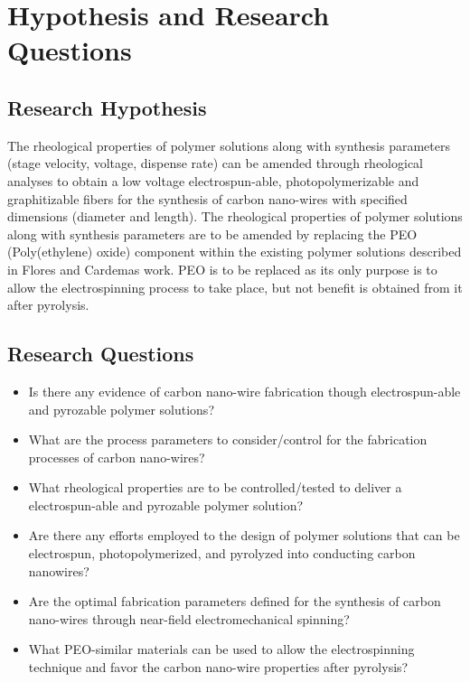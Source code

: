 
\chapter{Hypothesis and Research Questions} %

\label{Chapter:HypothesisandResearchQuestions}


\section{Research Hypothesis}

The rheological properties of polymer solutions along with synthesis parameters (stage velocity, voltage, dispense rate) can be amended through rheological analyses to obtain a low voltage electrospun-able, photopolymerizable and graphitizable fibers for the synthesis of carbon nano-wires with specified dimensions (diameter and length). The rheological properties of polymer solutions along with synthesis parameters are to be amended by replacing the PEO (Poly(ethylene) oxide) component within the existing polymer solutions described in Flores \cite{Flores2017} and Cardemas \cite{Cardenas2017} work. PEO is to be replaced as its only purpose is to allow the electrospinning process to take place, but not benefit is obtained from it after pyrolysis.

\section{Research Questions}

\begin{itemize}
	\item{
	Is there any evidence of carbon nano-wire fabrication though electrospun-able and pyrozable polymer solutions?
	}
	\item{
	What are the process parameters to consider/control for the fabrication processes of carbon nano-wires? 
	}
	\item{
	What rheological properties are to be controlled/tested to deliver a electrospun-able and pyrozable polymer solution?	
	}
	\item{
	Are there any efforts employed to the design of polymer solutions that can be electrospun, photopolymerized, and pyrolyzed into conducting carbon nanowires?
	}
	\item{
	Are the optimal fabrication parameters defined \cite{Cardenas2017} for the synthesis of carbon nano-wires through near-field electromechanical spinning?	
	}
	\item{
	What PEO-similar materials can be used to allow the electrospinning technique and favor the carbon nano-wire properties after pyrolysis? 
	}
\end{itemize}





